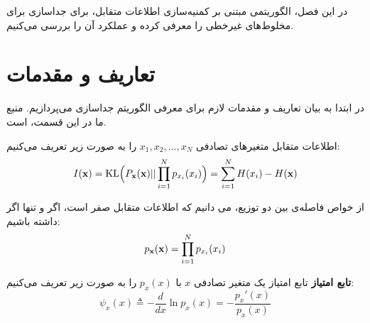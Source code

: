 \label{algs}
در این فصل، الگوریتمی مبتنی بر کمنیه‌سازی اطلاعات متقابل، برای جداسازی برای مخلوط‌های غیرخطی را معرفی کرده و عملکرد آن‌ را بررسی می‌کنیم.

\section{تعاریف و مقدمات}

در ابتدا به بیان تعاریف و مقدمات لازم برای معرفی الگوریتم جداسازی می‌پردازیم. منبع ما در این قسمت، 
\cite{mbzadehthesis}
است.
\begin{definition}
اطلاعات متقابل متغیر‌های تصادفی
$x_1, x_2, \dots, x_N$
را به صورت زیر تعریف می‌کنیم:
\begin{equation}
I(\mathbf{x}) = \mathrm{KL}\Big(P_{\mathbf{x}}(\mathbf{x}) || \prod_{i = 1}^{N} p_{x_i}(x_i)\Big) = \sum_{i = 1}^{N} H(x_i) - H(\mathbf{x})
\end{equation}
\end{definition}

از خواص فاصله‌ی 
بین دو توزیع، می دانیم که اطلاعات متقابل صفر است، اگر و تنها اگر داشته باشیم:
\begin{equation}
p_{\mathbf{x}}(\mathbf{x}) = \prod_{i = 1}^{N} p_{x_i}(x_i)
\end{equation}

\begin{definition}
\textbf{تابع امتیاز}
تابع امتیاز یک متغیر تصادفی 
$x$
با 
$p_x(x)$
را به صورت زیر تعریف می‌کنیم:
\begin{equation}
\psi_x(x) \triangleq -\frac{d}{dx} \ln p_x(x) = -\frac{p_x'(x)}{p_x(x)}
\end{equation}
\end{definition}

